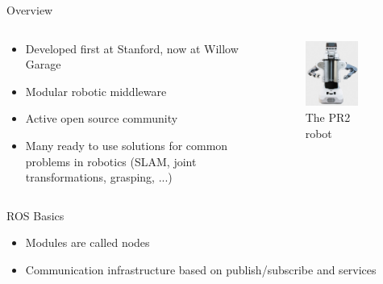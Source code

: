 \documentclass[compress]{beamer}
\begin{document}
\begin{frame}{Overview}

\begin{columns}
\begin{column}{.6\textwidth}
\begin{itemize}
\item Developed first at Stanford, now at Willow Garage
\item Modular robotic middleware
\item Active open source community
\item Many ready to use solutions for common problems in robotics (SLAM, joint transformations, grasping, ...)
\end{itemize}
\end{column}%
\hfill%
\begin{column}{.48\textwidth}
\begin{figure}[t]
    \centering
    \includegraphics[width=0.7\textwidth]{images/pr2.png}
    \caption[The PR2 robot]{The PR2 robot}
\end{figure}
\end{column}%
\end{columns}
\end{frame}

\begin{frame}{ROS Basics}
\begin{itemize}
\item Modules are called nodes
\item Communication infrastructure based on publish/subscribe and services
\end{itemize}
\end{frame}
\end{document}
